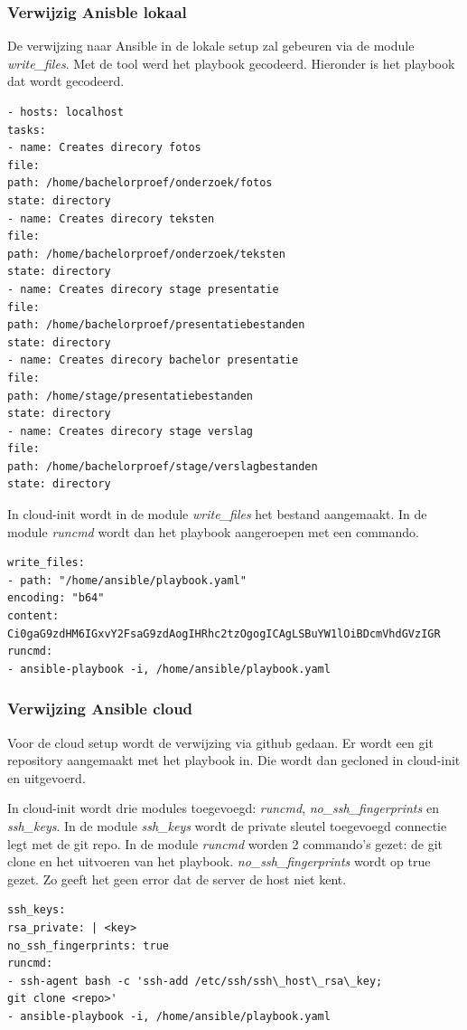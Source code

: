 \subsubsection{Verwijzig Anisble lokaal}
De verwijzing naar Ansible in de lokale setup zal gebeuren via de module \textit{write\_files}. Met de tool \autocite{toolbas64} werd het playbook gecodeerd. Hieronder is het playbook dat wordt gecodeerd.
\begin{lstlisting}
- hosts: localhost
tasks:
- name: Creates direcory fotos
file:
path: /home/bachelorproef/onderzoek/fotos
state: directory
- name: Creates direcory teksten
file:
path: /home/bachelorproef/onderzoek/teksten
state: directory
- name: Creates direcory stage presentatie
file:
path: /home/bachelorproef/presentatiebestanden
state: directory
- name: Creates direcory bachelor presentatie
file:
path: /home/stage/presentatiebestanden
state: directory
- name: Creates direcory stage verslag
file:
path: /home/bachelorproef/stage/verslagbestanden
state: directory
\end{lstlisting}

In cloud-init wordt in de module \textit{write\_files} het bestand aangemaakt. In de module \textit{runcmd} wordt dan het playbook aangeroepen met een commando.
\begin{lstlisting}
write_files:
- path: "/home/ansible/playbook.yaml"
encoding: "b64"
content: Ci0gaG9zdHM6IGxvY2FsaG9zdAogIHRhc2tzOgogICAgLSBuYW1lOiBDcmVhdGVzIGR
runcmd:
- ansible-playbook -i, /home/ansible/playbook.yaml
\end{lstlisting}

\subsubsection{Verwijzing Ansible cloud}
Voor de cloud setup wordt de verwijzing via github gedaan. Er wordt een git repository aangemaakt met het playbook in. Die wordt dan gecloned in cloud-init en uitgevoerd.

In cloud-init wordt drie modules toegevoegd: \textit{runcmd}, \textit{no\_ssh\_fingerprints} en \textit{ssh\_keys}. In de module \textit{ssh\_keys} wordt de private sleutel toegevoegd connectie legt met de git repo. In de module \textit{runcmd} worden 2 commando's gezet: de git clone en het uitvoeren van het playbook. \textit{no\_ssh\_fingerprints} wordt op true gezet. Zo geeft het geen error dat de server de host niet kent.
\begin{lstlisting}
ssh_keys:
rsa_private: | <key>
no_ssh_fingerprints: true
runcmd:
- ssh-agent bash -c 'ssh-add /etc/ssh/ssh\_host\_rsa\_key; 
git clone <repo>'
- ansible-playbook -i, /home/ansible/playbook.yaml
\end{lstlisting}

